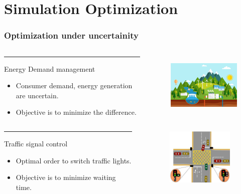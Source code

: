 

\section{Simulation Optimization}
\begin{frame}
\frametitle{\centering Optimization under uncertainity}
\begin{small}
\begin{block}{}
\begin{columns}[T]
\begin{column}{.48\textwidth}
\color{red}\rule{\linewidth}{4pt}
Energy Demand management
\begin{itemize}
\item Consumer demand, energy generation are uncertain.
\item Objective is to minimize the difference.
\end{itemize}
\end{column}
\begin{column}{.48\textwidth}
\begin{figure}
\includegraphics[width=5cm,height=3cm]{energymgmt}
\end{figure}
\end{column}
\end{columns}
\end{block}
\pause
\begin{block}{}
\begin{columns}[T]
\begin{column}{.48\textwidth}
\color{blue}\rule{\linewidth}{4pt}
Traffic signal control
\begin{itemize}
\item Optimal order to switch traffic lights.
\item Objective is to minimize waiting time.
\end{itemize}
\end{column}
\begin{column}{.48\textwidth}
\begin{figure}
\includegraphics[width=4cm,height=2.7cm]{traffic}
\end{figure}
\end{column}
\end{columns}
\end{block}

\end{small}
\end{frame}
